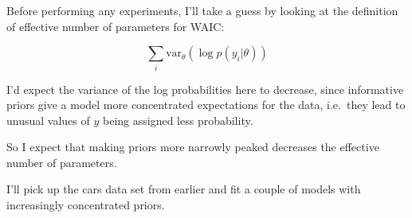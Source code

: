 \documentclass[
]{book}
\newenvironment{Shaded}{\begin{snugshade}}{\end{snugshade}}
\newcommand{\AttributeTok}[1]{\textcolor[rgb]{0.77,0.63,0.00}{#1}}
\newcommand{\CommentTok}[1]{\textcolor[rgb]{0.56,0.35,0.01}{\textit{#1}}}
\newcommand{\DecValTok}[1]{\textcolor[rgb]{0.00,0.00,0.81}{#1}}
\newcommand{\FloatTok}[1]{\textcolor[rgb]{0.00,0.00,0.81}{#1}}
\newcommand{\FunctionTok}[1]{\textcolor[rgb]{0.00,0.00,0.00}{#1}}
\newcommand{\NormalTok}[1]{#1}
\newcommand{\OtherTok}[1]{\textcolor[rgb]{0.56,0.35,0.01}{#1}}
\newcommand{\SpecialCharTok}[1]{\textcolor[rgb]{0.00,0.00,0.00}{#1}}
\newcommand{\StringTok}[1]{\textcolor[rgb]{0.31,0.60,0.02}{#1}}
\begin{document}
Before performing any experiments, I'll take a guess by looking at the definition of effective number of parameters for WAIC:

\[ \sum_i \text{var}_\theta ( \log p(y_i | \theta))\]

I'd expect the variance of the log probabilities here to decrease, since informative priors give a model more concentrated expectations for the data, i.e.~they lead to unusual values of \(y\) being assigned less probability.

So I expect that making priors more narrowly peaked decreases the effective number of parameters.

I'll pick up the cars data set from earlier and fit a couple of models with increasingly concentrated priors.

\begin{Shaded}
\end{Shaded}
\end{document}
